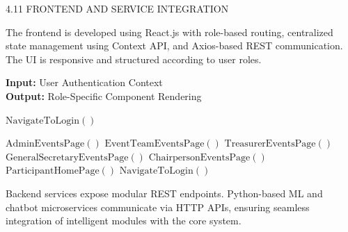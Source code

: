 4.11 FRONTEND AND SERVICE INTEGRATION

The frontend is developed using React.js with role-based routing, centralized state management using Context API, and Axios-based REST communication. The UI is responsive and structured according to user roles.

\begin{algorithm}[H]
\caption{Role-Based Frontend Routing}
\label{alg:frontend_routing}
\textbf{Input:} User Authentication Context\\
\textbf{Output:} Role-Specific Component Rendering
\begin{algorithmic}[1]
        \State \Return $\text{NavigateToLogin}()$
    \EndIf
    
            \State \Return $\text{AdminEventsPage}()$
        \EndCase
            \State \Return $\text{EventTeamEventsPage}()$
        \EndCase
            \State \Return $\text{TreasurerEventsPage}()$
        \EndCase
            \State \Return $\text{GeneralSecretaryEventsPage}()$
        \EndCase
            \State \Return $\text{ChairpersonEventsPage}()$
        \EndCase
            \State \Return $\text{ParticipantHomePage}()$
        \EndCase
        \Default
            \State \Return $\text{NavigateToLogin}()$
        \EndDefault
    \EndSwitch
\EndFunction
\end{algorithmic}
\end{algorithm}

Backend services expose modular REST endpoints. Python-based ML and chatbot microservices communicate via HTTP APIs, ensuring seamless integration of intelligent modules with the core system.

